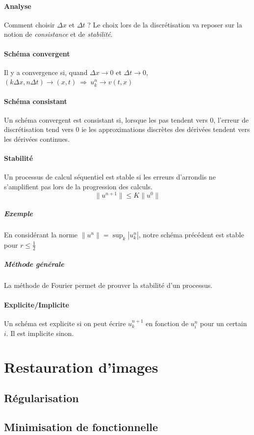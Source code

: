 \documentclass[french]{article}
\begin{document}
\paragraph{Analyse} Comment choisir $\Delta x$ et $\Delta t$ ? Le choix
lors de la discrétisation va reposer sur la notion de \emph{consistance}
et de \emph{stabilité}.

\paragraph{Schéma convergent} Il y a convergence si, quand $\Delta x \to 0$
et $\Delta t \to 0$, $(k\Delta x, n\Delta t) \to (x,t)\ \Rightarrow\ u_k^n \to v(t,x)$

\paragraph{Schéma consistant} Un schéma convergent est consistant si,
lorsque les pas tendent vers $0$, l'erreur de discrétisation tend vers $0$ ie
les approximations discrètes des dérivées tendent vers les dérivées continues.

\paragraph{Stabilité}Un processus de calcul séquentiel est stable si les
erreurs d'arrondis ne s'amplifient pas lors de la progression des calculs.
$$\|u^{n+1} \| \le K\|u^0\|$$

\subparagraph{Exemple} En considérant la norme $\|u^n\| = \sup_k{|u_k^n|}$,
notre schéma précédent est stable pour $r \le \frac{1}{2}$

\subparagraph{Méthode générale}La méthode de Fourier permet de prouver
la stabilité d'un processus.

\paragraph{Explicite/Implicite} Un schéma est explicite si on peut écrire
$u_k^{n+1}$ en fonction de $u_i^n$ pour un certain $i$. Il est implicite
sinon.

\section{Restauration d'images}
\subsection{Régularisation}
\subsection{Minimisation de fonctionnelle}
\end{document}
